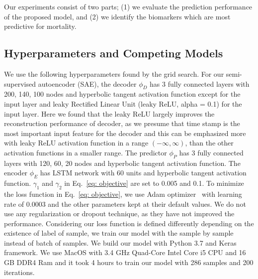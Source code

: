 Our experiments consist of two parts; (1) we evaluate the prediction performance of the proposed model, and (2) we identify the biomarkers which are most predictive for mortality.

\subsection{Hyperparameters and Competing Models}
We use the following hyperparameters found by the grid search. For our semi-supervised autoencoder (SAE), the decoder $\phi_D$ has 3 fully connected layers with 200, 140, 100 nodes and hyperbolic tangent activation function except for the input layer and leaky Rectified Linear Unit (leaky ReLU, alpha = 0.1) for the input layer. Here we found that the leaky ReLU largely improves the reconstruction performance of decoder, as we presume that time stamp is the most important input feature for the decoder and this can be emphasized more with leaky ReLU activation function in a range $(- \infty, \infty)$, than the other activation functions in a smaller range. The predictor $\phi_P$ has 3 fully connected layers with 120, 60, 20 nodes and hyperbolic tangent activation function. The encoder $\phi_E$ has LSTM network with 60 units and hyperbolic tangent activation function. $\gamma_1$ and $\gamma_2$ in Eq.~\eqref{eq: objective} are set to 0.005 and 0.1. To minimize the loss function in Eq.~\eqref{eq: objective}, we use Adam optimizer~\cite{kingma2014adam} with learning rate of 0.0003 and the other parameters kept at their default values. We do not use any regularization or dropout technique, as they have not improved the performance. Considering our loss function is defined differently depending on the existence of label of sample, we train our model with the sample by sample instead of batch of samples. We build our model with Python 3.7 and Keras~\cite{chollet2015keras} framework. We use MacOS with 3.4 GHz Quad-Core Intel Core i5 CPU and 16 GB DDR4 Ram and it took 4 hours to train our model with 286 samples and 200 iterations.


